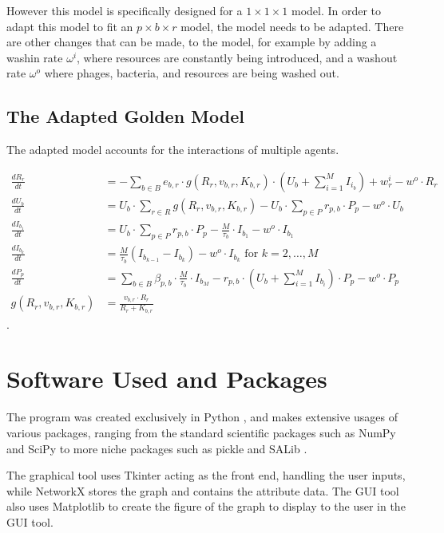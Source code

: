 However this model is specifically designed for a $1\times 1 \times 1$ model. 
In order to adapt this model to fit an $p \times b \times r$ model, the model needs to be adapted. 
There are other changes that can be made, to the model, for example by adding a washin rate $\omega^{i}$, where resources are constantly being introduced, and a washout rate $\omega^{o}$ where phages, bacteria, and resources are being washed out. 

\subsection{The Adapted Golden Model}
\label{sec:adapted_golden_model}
The adapted model accounts for the interactions of multiple agents. 

\begin{align}
    \frac{dR_r}{dt} &= -\sum_{b \in B} e_{b, r} \cdot g(R_r, v_{b, r}, K_{b, r})\cdot (U_b + \sum_{i=1}^{M} I_{i_b}) + w^i_r - w^o \cdot R_r\\
    \frac{dU_b}{dt} &= U_b \cdot \sum_{r \in R} g(R_r, v_{b, r}, K_{b, r}) - U_b \cdot \sum_{p \in P} r_{p, b} \cdot P_p - w^o \cdot U_b\\
    \frac{dI_{b_1}}{dt} &= U_b \cdot \sum_{p \in P}r_{p, b} \cdot P_p - \frac{M}{\tau_b}\cdot I_{b_1} - w^o \cdot I_{b_1}\\
    \frac{dI_{b_k}}{dt} &= \frac{M}{\tau_b}(I_{b_{k-1}}-I_{b_k}) - w^o \cdot I_{b_k}\text{ for } k=2, \dots, M \\
    \frac{dP_p}{dt} &= \sum_{b\in B}\beta_{p, b}\cdot\frac{M}{\tau_b} \cdot I_{b_M} - r_{p, b}\cdot(U_b + \sum_{i=1}^{M} I_{b_i})\cdot P_p - w^o \cdot P_p\\
    g(R_r, v_{b, r}, K_{b, r}) &= \frac{v_{b, r} \cdot R_r}{R_r + K_{b, r}}
\end{align}. 


\section{Software Used and Packages}
The program was created exclusively in Python \cite{Python}, and makes extensive usages of various packages, ranging from the standard scientific packages such as NumPy \cite{NumPy} and SciPy to more niche packages such as pickle and SALib \cite{iwanagaSALib20Advancing2022, hermanSALibOpensourcePython2017}.

The graphical tool uses Tkinter acting as the front end, handling the user inputs, while NetworkX \cite{hagbergExploringNetworkStructure2008} stores the graph and contains the attribute data. 
The GUI tool also uses Matplotlib \cite{Matplotlib}to create the figure of the graph to display to the user in the GUI tool.

